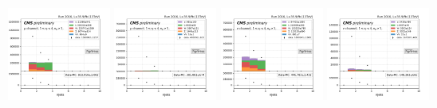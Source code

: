 \begin{figure}
    \includegraphics[width=0.24\textwidth]{chapters/Appendix/sectionQCD/figures/123j1b/mu_nJets_True.png}
    \includegraphics[width=0.24\textwidth]{chapters/Appendix/sectionQCD/figures/123j1b/mu_nJets_False.png}
    \includegraphics[width=0.24\textwidth]{chapters/Appendix/sectionQCD/figures/123j1b/e_nJets_True.png}
    \includegraphics[width=0.24\textwidth]{chapters/Appendix/sectionQCD/figures/123j1b/e_nJets_False.png}
    

\end{figure}
